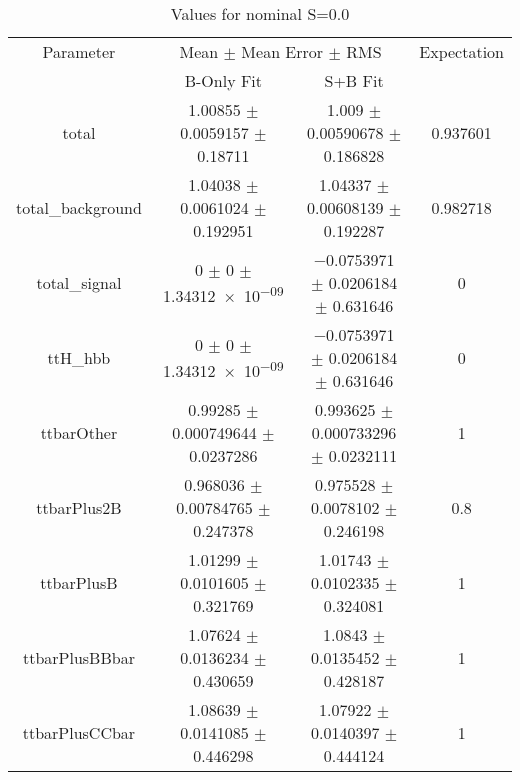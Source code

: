 \begin{table}
\centering
\caption{Values for nominal S=0.0}
\begin{tabular}{cccc}
\toprule
Parameter & \multicolumn{2}{c}{Mean $\pm$ Mean Error $\pm$ RMS} & Expectation\\
 & B-Only Fit & S+B Fit & \\
\midrule
total & \num{1.00855} $\pm$ \num{0.0059157} $\pm$ \num{0.18711} & \num{1.009} $\pm$ \num{0.00590678} $\pm$ \num{0.186828} & \num{0.937601}\\
total\_background & \num{1.04038} $\pm$ \num{0.0061024} $\pm$ \num{0.192951} & \num{1.04337} $\pm$ \num{0.00608139} $\pm$ \num{0.192287} & \num{0.982718}\\
total\_signal & \num{0} $\pm$ \num{0} $\pm$ \num{1.34312e-09} & \num{-0.0753971} $\pm$ \num{0.0206184} $\pm$ \num{0.631646} & \num{0}\\
ttH\_hbb & \num{0} $\pm$ \num{0} $\pm$ \num{1.34312e-09} & \num{-0.0753971} $\pm$ \num{0.0206184} $\pm$ \num{0.631646} & \num{0}\\
ttbarOther & \num{0.99285} $\pm$ \num{0.000749644} $\pm$ \num{0.0237286} & \num{0.993625} $\pm$ \num{0.000733296} $\pm$ \num{0.0232111} & \num{1}\\
ttbarPlus2B & \num{0.968036} $\pm$ \num{0.00784765} $\pm$ \num{0.247378} & \num{0.975528} $\pm$ \num{0.0078102} $\pm$ \num{0.246198} & \num{0.8}\\
ttbarPlusB & \num{1.01299} $\pm$ \num{0.0101605} $\pm$ \num{0.321769} & \num{1.01743} $\pm$ \num{0.0102335} $\pm$ \num{0.324081} & \num{1}\\
ttbarPlusBBbar & \num{1.07624} $\pm$ \num{0.0136234} $\pm$ \num{0.430659} & \num{1.0843} $\pm$ \num{0.0135452} $\pm$ \num{0.428187} & \num{1}\\
ttbarPlusCCbar & \num{1.08639} $\pm$ \num{0.0141085} $\pm$ \num{0.446298} & \num{1.07922} $\pm$ \num{0.0140397} $\pm$ \num{0.444124} & \num{1}\\
\bottomrule
\end{tabular}
\end{table}